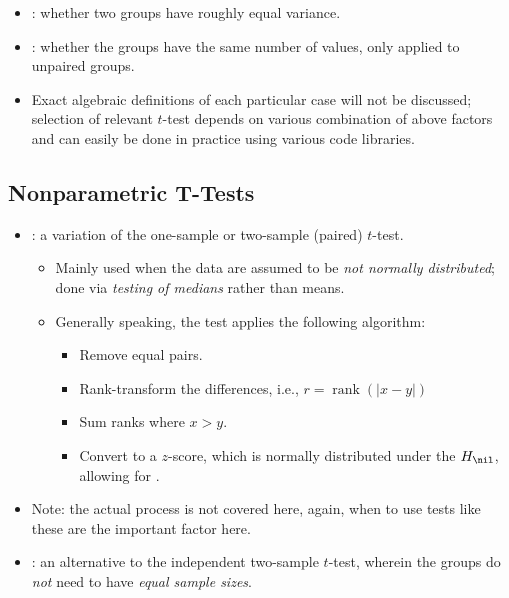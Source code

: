 \begin{itemize}
\begin{itemize}
\begin{itemize}
      \item {}: whether two groups have roughly equal variance.
      \item {}: whether the groups have the same number of values, only applied to unpaired groups.
      \item Exact algebraic definitions of each particular case will not be discussed; selection of relevant \(t\)-test depends on various combination of above factors and can easily be done in practice using various code libraries.
    \end{itemize}
  \end{itemize}

  \subsection{Nonparametric T-Tests}
  \begin{itemize}
    \item {}: a \hyperref[Subsection: Parametric vs. Nonparametric]{} variation of the one-sample or two-sample (paired) \(t\)-test.
      \begin{itemize}
        \item Mainly used when the data are assumed to be \emph{not normally distributed}; done via \emph{testing of medians} rather than means.
        \item Generally speaking, the test applies the following algorithm:
          \begin{itemize}
            \item Remove equal pairs.
            \item Rank-transform the differences, i.e., \(r= \operatorname{rank}(|x-y|)\)
            \item Sum ranks where \(x>y\).
            \item Convert to a \(z\)-score, which is normally distributed under the \(H_\nil\), allowing for \hyperref[Subsection: Degrees of Freedom]{}.
          \end{itemize}
      \end{itemize}
      \item Note: the actual process is not covered here, again, when to use tests like these are the important factor here.
      \item {}: an alternative to the independent two-sample \(t\)-test, wherein the groups do \emph{not} need to have \emph{equal sample sizes}.

\end{itemize}
\end{itemize}
